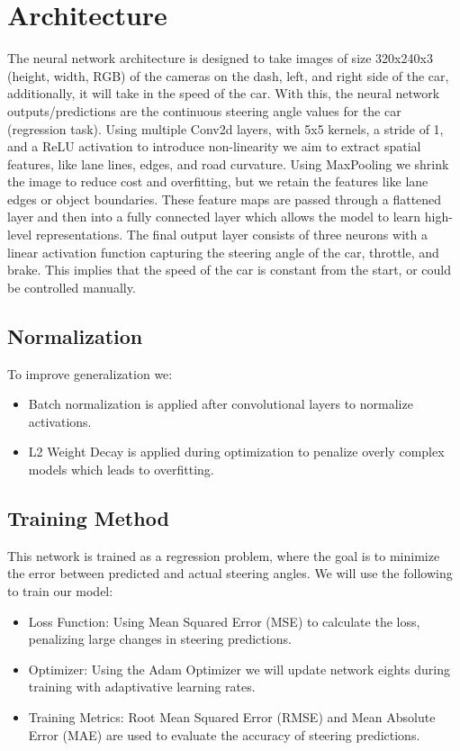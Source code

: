 \documentclass{article} %
\begin{document}
\section{Architecture}

The neural network architecture is designed to take images of size 320x240x3 (height, width, RGB) of the cameras on the dash, left, and right side of the car, additionally, it will take in the speed of the car. With this, the neural network outputs/predictions are the continuous steering angle values for the car (regression task). Using multiple Conv2d layers, with 5x5 kernels, a stride of 1, and a ReLU activation to introduce non-linearity we aim to extract spatial features, like lane lines, edges, and road curvature. Using MaxPooling we shrink the image to reduce cost and overfitting, but we retain the features like lane edges or object boundaries. These feature maps are passed through a flattened layer and then into a fully connected layer which allows the model to learn high-level representations. The final output layer consists of three neurons with a linear activation function capturing the steering angle of the car, throttle, and brake. This implies that the speed of the car is constant from the start, or could be controlled manually.

\subsection{Normalization}
To improve generalization we:
\begin{itemize}
  \item Batch normalization is applied after convolutional layers to normalize activations.
  \item L2 Weight Decay is applied during optimization to penalize overly complex models which leads to overfitting.
\end{itemize}

\subsection{Training Method}
This network is trained as a regression problem, where the goal is to minimize the error between predicted and actual
steering angles. We will use the following to train our model:
\begin{itemize}
  \item Loss Function: Using Mean Squared Error (MSE) to calculate the loss, penalizing large changes in steering
  predictions.
  \item Optimizer: Using the Adam Optimizer we will update network eights during training with adaptivative learning rates.
  \item Training Metrics: Root Mean Squared Error (RMSE) and Mean Absolute Error (MAE) are used to evaluate the accuracy of steering predictions.
\end{itemize}
\end{document}
